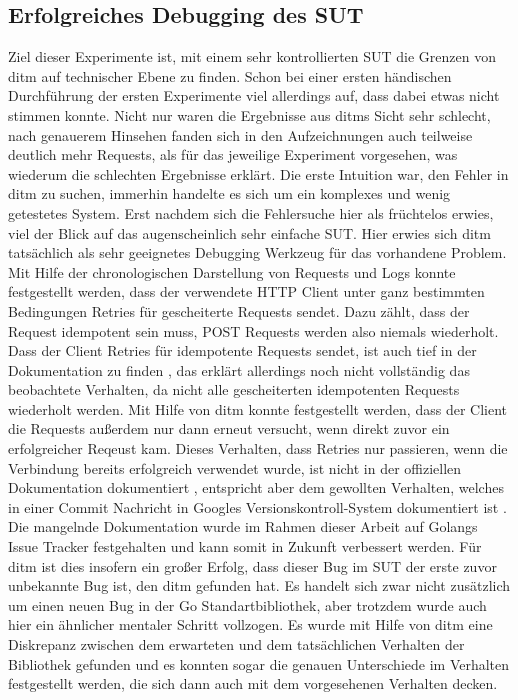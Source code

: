 \documentclass[12pt,a4paper]{report}
\begin{document}
\subsection{Erfolgreiches Debugging des SUT}
Ziel dieser Experimente ist, mit einem sehr kontrollierten SUT die Grenzen von ditm auf technischer Ebene zu finden.
Schon bei einer ersten händischen Durchführung der ersten Experimente viel allerdings auf, dass dabei etwas nicht stimmen konnte.
Nicht nur waren die Ergebnisse aus ditms Sicht sehr schlecht, nach genauerem Hinsehen fanden sich in den Aufzeichnungen auch
teilweise deutlich mehr Requests, als für das jeweilige Experiment vorgesehen, was wiederum die schlechten Ergebnisse erklärt.
Die erste Intuition war, den Fehler in ditm zu suchen, immerhin handelte es sich um ein komplexes und wenig getestetes System.
Erst nachdem sich die Fehlersuche hier als früchtelos erwies, viel der Blick auf das augenscheinlich sehr einfache SUT.
Hier erwies sich ditm tatsächlich als sehr geeignetes Debugging Werkzeug für das vorhandene Problem. Mit Hilfe der chronologischen
Darstellung von Requests und Logs konnte festgestellt werden, dass der verwendete HTTP Client unter ganz bestimmten Bedingungen
Retries für gescheiterte Requests sendet. Dazu zählt, dass der Request idempotent sein muss, POST Requests werden also niemals
wiederholt. Dass der Client Retries für idempotente Requests sendet, ist auch tief in der Dokumentation zu finden \cite{go_transport_docs},
das erklärt allerdings noch nicht vollständig das beobachtete Verhalten, da nicht alle gescheiterten idempotenten Requests wiederholt werden.
Mit Hilfe von ditm konnte festgestellt werden, dass der Client die Requests außerdem nur dann erneut versucht, wenn direkt zuvor
ein erfolgreicher Reqeust kam. Dieses Verhalten, dass Retries nur passieren, wenn die Verbindung bereits erfolgreich verwendet wurde,
ist nicht in der offiziellen Dokumentation dokumentiert \cite{go_transport_docs}, entspricht aber dem gewollten Verhalten, welches in
einer Commit Nachricht in Googles Versionskontroll-System dokumentiert ist \cite{go_retry_commit}. Die mangelnde Dokumentation
wurde im Rahmen dieser Arbeit auf Golangs Issue Tracker festgehalten und kann somit in Zukunft verbessert werden.
Für ditm ist dies insofern ein großer Erfolg, dass dieser Bug im SUT der erste zuvor unbekannte Bug ist, den ditm gefunden hat.
Es handelt sich zwar nicht zusätzlich um einen neuen Bug in der Go Standartbibliothek, aber trotzdem wurde auch hier ein
ähnlicher mentaler Schritt vollzogen. Es wurde mit Hilfe von ditm eine Diskrepanz zwischen dem erwarteten und dem tatsächlichen
Verhalten der Bibliothek gefunden und es konnten sogar die genauen Unterschiede im Verhalten festgestellt werden, die sich dann auch
mit dem vorgesehenen Verhalten decken.
\end{document}
